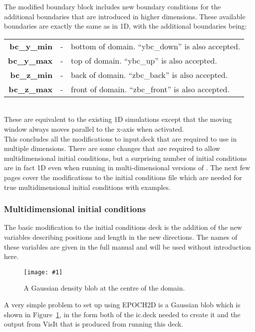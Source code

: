 \documentclass[12pt,a4paper]{article}
\newcommand{\inlineemph}[1]{{\color{warwicklight} \bf{#1}}}
\newcommand{\EPOCH}{{\color{warwickdark}\fontfamily{phv}\selectfont{EPOCH}}}
\newcommand{\scaledcapimage}[4]
  {{\begin{figure}[hbt!]\centering\texttt{[image: \#1]}\caption{#3}
    \label{#2} \end{figure}}}
\begin{document}
The modified boundary block includes new boundary conditions for the additional
boundaries that are introduced in higher dimensions. These available boundaries
are exactly the same as in 1D, with the additional boundaries being:\\

\begin{tabular}{rcl}
\inlineemph{bc\_y\_min} &-& bottom of domain. ``ybc\_down'' is also accepted.\\
\inlineemph{bc\_y\_max} &-& top of domain. ``ybc\_up'' is also accepted.\\
\inlineemph{bc\_z\_min} &-& back of domain. ``zbc\_back'' is also accepted.\\
\inlineemph{bc\_z\_max} &-& front of domain. ``zbc\_front'' is also accepted.\\
\end{tabular} \\

These are equivalent to the existing 1D simulations except that the moving
window always moves parallel to the x-axis when activated.\\
This concludes all
the modifications to input.deck that are required to use {\EPOCH} in multiple
dimensions. There are some changes that are required to allow
multidimensional initial conditions, but a surprising number of initial
conditions are in fact 1D even when running in multi-dimensional versions of
{\EPOCH}. The next few pages cover the modifications to the initial conditions
file which are needed for true multidimensional initial conditions with
examples.

\subsubsection{Multidimensional initial conditions}

The basic modification to the {\EPOCH} initial conditions deck is the addition
of the new variables describing positions and length in the new directions. The
names of these variables are given in the full manual and will be used without
introduction here.

\scaledcapimage{./images/gaussic}{gaussblob}{A Gaussian density blob at the
  centre of the domain.}{0.4}

A very simple problem to set up using EPOCH2D is a Gaussian blob which is
shown in Figure~\ref{gaussblob}, in the form both of the ic.deck needed to
create it and the output from VisIt that is produced from running this deck.
\end{document}
